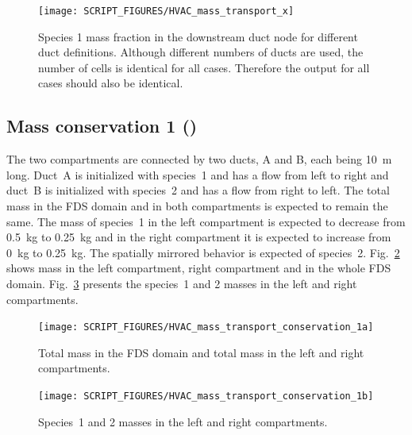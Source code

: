 \documentclass[11pt]{book}
\begin{document}
\begin{figure}[ht]
\centering
\texttt{[image: SCRIPT\_FIGURES/HVAC\_mass\_transport\_x]}
\caption[ test case.]{Species \num{1} mass fraction in the downstream duct node for different duct definitions. Although different numbers of ducts are used, the number of cells is identical for all cases. Therefore the output for all cases should also be identical.}
\label{fig_HVAC_mass_transport_x}
\end{figure}

\subsection{Mass conservation 1 (\texorpdfstring{}{HVAC\_mass\_transport\_conservation\_1})}
\label{HVAC_mass_transport_conservation_1}
The two compartments are connected by two ducts, A and B, each being \SI{10}{\meter} long. Duct~A is initialized with species~1 and has a flow from left to right and duct~B is initialized with species~2 and has a flow from right to left. The total mass in the FDS domain and in both compartments is expected to remain the same. The mass of species~1 in the left compartment is expected to decrease from \SI{0.5}{\kilogram} to \SI{0.25}{\kilogram} and in the right compartment it is expected to increase from \SI{0}{\kilogram} to \SI{0.25}{\kilogram}. The spatially mirrored behavior is expected of species~2. Fig.~\ref{fig_HVAC_mass_transport_conservation_1a} shows mass in the left compartment, right compartment and in the whole FDS domain. Fig.~\ref{fig_HVAC_mass_transport_conservation_1b} presents the species~1 and 2 masses in the left and right compartments.

\begin{figure}[ht]
\centering
\texttt{[image: SCRIPT\_FIGURES/HVAC\_mass\_transport\_conservation\_1a]}
\caption[ test case.]{Total mass in the FDS domain and total mass in the left and right compartments.}
\label{fig_HVAC_mass_transport_conservation_1a}
\end{figure}

\begin{figure}[ht]
\centering
\texttt{[image: SCRIPT\_FIGURES/HVAC\_mass\_transport\_conservation\_1b]}
\caption[ test case.]{Species~1 and 2 masses in the left and right compartments.}
\label{fig_HVAC_mass_transport_conservation_1b}
\end{figure}
\end{document}
